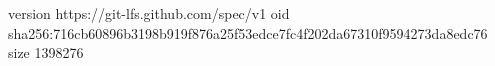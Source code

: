 version https://git-lfs.github.com/spec/v1
oid sha256:716cb60896b3198b919f876a25f53edce7fc4f202da67310f9594273da8edc76
size 1398276
